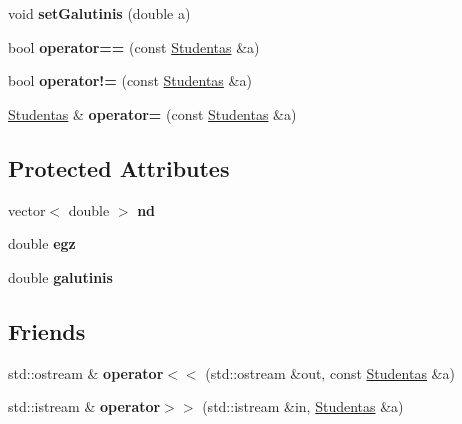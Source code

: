 \begin{DoxyCompactItemize}
\mbox{\label{class_studentas_a2e56f86949cf673eb8a26f888e23364d}} 
void {\bfseries set\+Galutinis} (double a)
\item 
\mbox{\label{class_studentas_ad48dd27c88d29a0d20be0f4e1020b19c}} 
bool {\bfseries operator==} (const \mbox{\hyperlink{class_studentas}{Studentas}} \&a)
\item 
\mbox{\label{class_studentas_a9f05264ff4715f89f6e059fe45c000fb}} 
bool {\bfseries operator!=} (const \mbox{\hyperlink{class_studentas}{Studentas}} \&a)
\item 
\mbox{\label{class_studentas_a5061f9f87bd269e505d2948c8c0b157a}} 
\mbox{\hyperlink{class_studentas}{Studentas}} \& {\bfseries operator=} (const \mbox{\hyperlink{class_studentas}{Studentas}} \&a)
\end{DoxyCompactItemize}
\subsection*{Protected Attributes}
\begin{DoxyCompactItemize}
\item 
\mbox{\label{class_studentas_a351cfe2242771afc92ce7a4451930fee}} 
vector$<$ double $>$ {\bfseries nd}
\item 
\mbox{\label{class_studentas_a337b64c8f83383bf5d08ba20e00161b0}} 
double {\bfseries egz}
\item 
\mbox{\label{class_studentas_a766bdebc50d4c51776618e2e4e9cef52}} 
double {\bfseries galutinis}
\end{DoxyCompactItemize}
\subsection*{Friends}
\begin{DoxyCompactItemize}
\item 
\mbox{\label{class_studentas_affd83510a14089280f8cca5ab929d753}} 
std\+::ostream \& {\bfseries operator$<$$<$} (std\+::ostream \&out, const \mbox{\hyperlink{class_studentas}{Studentas}} \&a)
\item 
\mbox{\label{class_studentas_a71c0b5129af3a0cb3f6e081a2a3e057f}} 
std\+::istream \& {\bfseries operator$>$$>$} (std\+::istream \&in, \mbox{\hyperlink{class_studentas}{Studentas}} \&a)
\end{DoxyCompactItemize}
